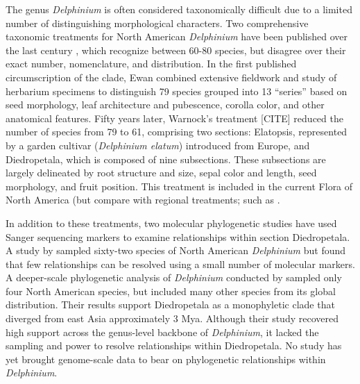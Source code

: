 \documentclass[11pt]{article}
\begin{document}
The genus \emph{Delphinium} is often considered taxonomically difficult due to a 
limited number of 
distinguishing
morphological characters. Two comprehensive 
taxonomic treatments for North American \emph{Delphinium} have been published over 
the last century \citep{benson_synopsis_1946,ewan_1945, warnock_1997}, %
which recognize between 60-80 species, but disagree over their exact number, 
nomenclature, and distribution. 
% 
In the first published circumscription of the clade, Ewan combined extensive 
fieldwork and study of herbarium specimens to distinguish 79 species grouped 
into 13 “series” based on seed morphology, leaf architecture and pubescence, 
corolla color, and other anatomical features. 
% 
Fifty years later, Warnock’s treatment [CITE] reduced the number of species 
from 79 to 61, comprising two sections: Elatopsis, represented by a garden 
cultivar (\emph{Delphinium elatum}) introduced from Europe, and 
Diedropetala, which is composed of nine subsections.
%
These subsections are largely delineated by root structure and size, 
sepal color and length, seed morphology, and fruit position.
% 
This treatment is included in the current Flora of North America 
\citep{...} (but compare with regional treatments; such as 
\citep{ackerfield_flora_2022,chambers_comments_2018,holmgren_2012,koontz_2012}.


In addition to these treatments, two molecular phylogenetic studies have used
Sanger sequencing markers to examine relationships within section Diedropetala.
% 
A study by \citet{koontz_using_2004} sampled sixty-two species of 
North American \emph{Delphinium} but found that few relationships can
be resolved using a small number of molecular markers. 
% 
A deeper-scale phylogenetic analysis of \emph{Delphinium} conducted
by \cite{jabbour_phylogeny_2012} sampled only four North American species,
but included many other species from its global distribution.
Their results support Diedropetala as a monophyletic clade that diverged
from east Asia approximately 3 Mya. 
% 
Although their study recovered high support across the genus-level 
backbone of \emph{Delphinium}, it lacked the sampling and power to 
resolve relationships within Diedropetala.
% 
No study has yet brought genome-scale data to bear on phylogenetic 
relationships within \emph{Delphinium}.
\end{document}
